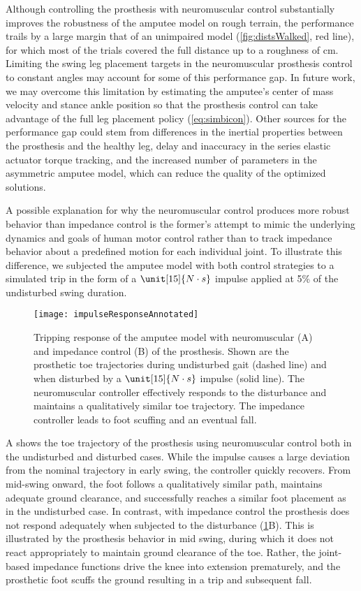 Although controlling the prosthesis with neuromuscular control substantially
improves the robustness of the amputee model on rough terrain, the performance
trails by a large margin that of an unimpaired model (\cref{fig:distsWalked},
red line), for which most of the trials covered the full distance up to a
roughness of \unit[10]{cm}.  Limiting the swing leg placement targets in the
neuromuscular prosthesis control to constant angles may account for some of this
performance gap. In future work, we may overcome this limitation by estimating
the amputee's center of mass velocity and stance ankle position so that the
prosthesis control can take advantage of the full leg placement policy
(\cref{eq:simbicon}). Other sources for the performance gap could stem from
differences in the inertial properties between the prosthesis and the healthy
leg, delay and inaccuracy in the series elastic actuator torque tracking, and
the increased number of parameters in the asymmetric amputee model, which can
reduce the quality of the optimized solutions.

A possible explanation for why the neuromuscular control produces more robust
behavior than impedance control is the former's attempt to mimic the underlying
dynamics and goals of human motor control rather than to track impedance
behavior about a predefined motion for each individual joint. To illustrate this
difference, we subjected the amputee model with both control strategies to a
simulated trip in the form of a $\unit[15]{N \cdot s}$ impulse applied at 5\% of
the undisturbed swing duration. 

\begin{figure*}[t]
    \centering
    \texttt{[image: impulseResponseAnnotated]}
    \caption[Simulated tripping response of the amputee model with neuromuscular
    and impedance control]{Tripping response of the amputee model with
    neuromuscular (A) and impedance control (B) of the prosthesis. Shown are the
    prosthetic toe trajectories during undisturbed gait (dashed line) and when
    disturbed by a $\unit[15]{N \cdot s}$ impulse (solid line). The
    neuromuscular controller effectively responds to the disturbance and
    maintains a qualitatively similar toe trajectory. The impedance controller
    leads to foot scuffing and an eventual fall.}\label{fig:ImpulseResponses}
\end{figure*}

A shows the toe trajectory of the prosthesis using
neuromuscular control both in the undisturbed and disturbed cases. While the
impulse causes a large deviation from the nominal trajectory in early swing, the
controller quickly recovers. From mid-swing onward, the foot follows a
qualitatively similar path, maintains adequate ground clearance, and
successfully reaches a similar foot placement as in the undisturbed case. In
contrast, with impedance control the prosthesis does not respond adequately when
subjected to the disturbance (\cref{fig:ImpulseResponses}B). This is illustrated
by the prosthesis behavior in mid swing, during which it does not react
appropriately to maintain ground clearance of the toe. Rather, the joint-based
impedance functions drive the knee into extension prematurely, and the
prosthetic foot scuffs the ground resulting in a trip and subsequent fall.
